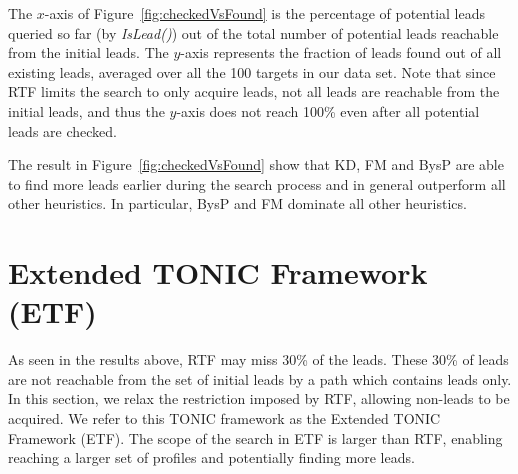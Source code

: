 \documentclass[prodmode,acmtecs]{acmsmall} %
\newcommand{\note}[2]{\textbf{\textsc{#1} says: \textit{#2}}}
\newcommand{\islead}[1]{{\em IsLead(#1)}}
\newcommand{\acquire}[1]{{\em Acquire(#1)}}
\begin{document}
The $x$-axis of Figure~\ref{fig:checkedVsFound} is the  percentage of potential leads queried so far (by \islead{}) out of the total number of potential leads reachable from the initial leads. The $y$-axis represents the fraction of leads found out of all existing leads, averaged over all the 100 targets in our data set. Note that since RTF limits the search to only acquire leads, not all leads are reachable from the initial leads, and thus the $y$-axis does not reach 100\% even after all potential leads are checked. 



The result in Figure~\ref{fig:checkedVsFound} show that KD, FM and BysP are able to find more leads earlier during the search process and in general outperform all other heuristics. In particular, BysP and FM dominate all other heuristics. %


\section{Extended TONIC Framework (ETF)}
\label{sec:etf}



As seen in the results above, RTF may miss 30\% of the leads. These 30\% of leads are not reachable from the set of initial leads by a path which contains leads only. In this section, we relax the restriction imposed by RTF, allowing non-leads to be acquired. We refer to this TONIC framework as the Extended TONIC Framework (ETF). The scope of the search in ETF is larger than RTF, enabling reaching a larger set of profiles and potentially finding more leads. %
\end{document}
